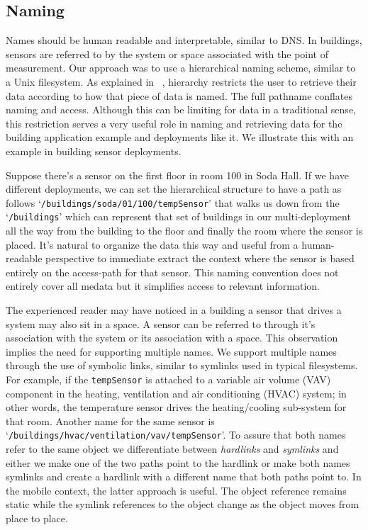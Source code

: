 \subsection{Naming}
Names should be human readable and interpretable, similar to DNS.  In buildings, sensors are referred to by the system or space
associated with the point of measurement.  Our approach was to use a hierarchical naming scheme, similar to a Unix filesystem.  
As explained in ~\cite{seltzerHierarchy},
hierarchy  restricts the user to retrieve their data according to how that piece of data is named. The full pathname conflates naming and access.
Although this can be limiting for data in a traditional sense, this restriction serves a very useful role in naming and retrieving data for
the building application example and deployments like it.  We illustrate this with an example in building sensor deployments.

Suppose there's a sensor on the first floor in room 100 in Soda Hall.  If we have different deployments, we can set the hierarchical
structure to have a path as follows `{\tt /buildings/soda/01/100/tempSensor}' that walks us down from the `{\tt /buildings}' which can represent
that set of buildings in our multi-deployment all the way from the building to the floor and finally the room where the sensor is placed.
It's natural to organize the data this way and useful from a human-readable perspective to immediate extract the context where the sensor
is based entirely on the access-path for that sensor.  This naming convention does not entirely cover all medata but it
simplifies access to relevant information.

The experienced reader may have noticed in a building a sensor that drives a system may also sit in a space.  A sensor can be 
referred to through it's association with the system or its association with a space.  This observation implies the need for supporting 
multiple names.  We support multiple names through the use of symbolic links, similar to symlinks used in typical filesystems.
For example, if the {\tt tempSensor} is attached to a  variable air volume (VAV) component in the heating, ventilation and air conditioning
(HVAC) system; in other words, the temperature sensor drives the heating/cooling sub-system for that room.  Another name
for the same sensor is `{\tt /buildings/hvac/ventilation/vav/tempSensor}'.  To assure that both names refer to the same object we differentiate
between \emph{hardlinks} and \emph{symlinks} and either we make one of the two paths point to the hardlink or make both names symlinks
and create a hardlink with a different name that both paths point to.  In the mobile context, the latter approach is useful.  The object
reference remains static while the symlink references to the object change as the object moves from place to place.

